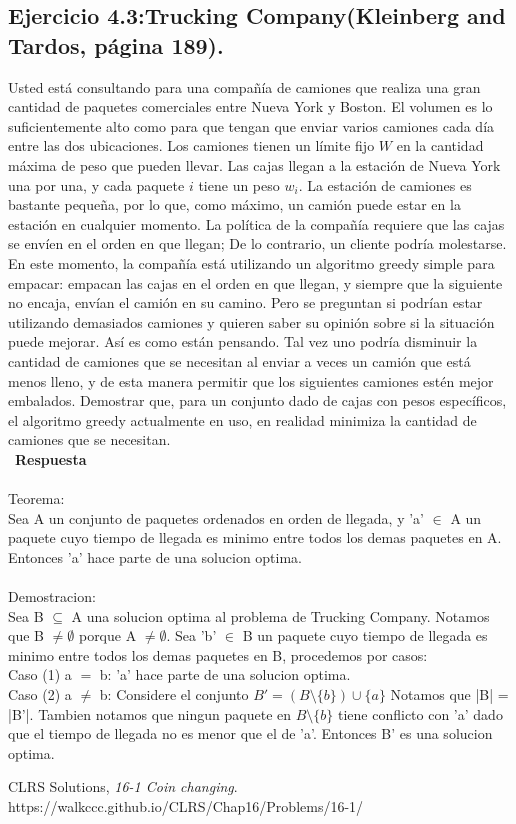 \documentclass[a4paper,12pt]{article}
\begin{document}
\subsection{Ejercicio 4.3:Trucking Company(Kleinberg and Tardos, página 189).}
Usted está consultando para una compañía de camiones que realiza una gran cantidad de paquetes comerciales entre Nueva York y Boston. El volumen es lo suficientemente alto como para que tengan que enviar varios camiones cada día entre las dos ubicaciones. Los camiones tienen un límite fijo $W$ en la cantidad máxima de peso que pueden llevar. Las cajas llegan a la estación de Nueva York una por una, y cada paquete $i$ tiene un peso $w_i$. La estación de camiones es bastante pequeña, por lo que, como máximo, un camión puede estar en la estación en cualquier momento. La política de la compañía requiere que las cajas se envíen en el orden en que llegan; De lo contrario, un cliente podría molestarse. En este momento, la compañía está utilizando un algoritmo greedy simple para empacar: empacan las cajas en el orden en que llegan, y siempre que la siguiente no encaja, envían el camión en su camino. Pero se preguntan si podrían estar utilizando demasiados camiones y quieren saber su opinión sobre si la situación puede mejorar. Así es como están pensando. Tal vez uno podría disminuir la cantidad de camiones que se necesitan al enviar a veces un camión que está menos lleno, y de esta manera permitir que los siguientes camiones estén mejor embalados. Demostrar que, para un conjunto dado de cajas con pesos específicos, el algoritmo greedy actualmente en uso, en realidad minimiza la cantidad de camiones que se necesitan.\\\
\textbf{Respuesta}\\\\
Teorema:\\
Sea A un conjunto de paquetes ordenados en orden de llegada, y 'a' $\in$ A un paquete cuyo tiempo de llegada es minimo entre todos los demas paquetes en A. Entonces 'a' hace parte de una solucion optima.\\\\
Demostracion:\\
Sea B $\subseteq$ A una solucion optima al problema de Trucking Company. Notamos que B $\ne \emptyset$ porque A $\ne \emptyset$.
Sea 'b' $\in$ B un paquete cuyo tiempo de llegada es minimo entre todos los demas paquetes en B, procedemos por casos:\\
Caso (1) a $=$ b: 'a' hace parte de una solucion optima.\\
Caso (2) a $\ne$ b: Considere el conjunto $B' = (B \setminus \{b\}) \cup \{a\}$ Notamos que |B| = |B'|. Tambien notamos que ningun paquete en $B \setminus \{b\}$ tiene conflicto con 'a' dado que el tiempo de llegada no es menor que el de 'a'. Entonces B' es una solucion optima.
\clearpage
\begin{thebibliography}{15}

  CLRS Solutions,
  \emph{16-1 Coin changing}.\\
  https://walkccc.github.io/CLRS/Chap16/Problems/16-1/

\end{thebibliography}

\end{document}
